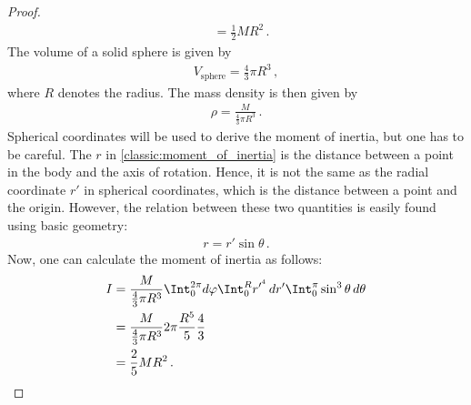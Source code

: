 \begin{example}
\begin{mdframed}[roundcorner=10pt, linecolor=blue, linewidth=1pt]
\begin{proof}
\begin{align*}
                    &= \frac{1}{2}MR^2\,.
                \end{align*}
                The volume of a solid sphere is given by
                \begin{gather*}
                    V_{\text{sphere}} = \frac{4}{3}\pi R^3\,,
                \end{gather*}
                where $R$ denotes the radius. The mass density is then given by
                \begin{gather*}
                    \rho = \frac{M}{\frac{4}{3}\pi R^3}\,.
                \end{gather*}
                Spherical coordinates will be used to derive the moment of inertia, but one has to be careful. The $r$ in \cref{classic:moment_of_inertia} is the distance between a point in the body and the axis of rotation. Hence, it is not the same as the radial coordinate $r'$ in spherical coordinates, which is the distance between a point and the origin. However, the relation between these two quantities is easily found using basic geometry:
                \begin{gather*}
                    r=r'\sin\theta\,.
                \end{gather*}
                Now, one can calculate the moment of inertia as follows:
                \begin{align*}
                    I &= \frac{M}{\frac{4}{3}\pi R^3}\Int_0^{2\pi}d\varphi\Int_0^Rr'^{^4}\,dr'\Int_0^\pi\sin^3\theta\,d\theta\\
                    &= \frac{M}{\frac{4}{3}\pi R^3} 2\pi\frac{R^5}{5}\frac{4}{3}\\
                    &= \frac{2}{5}MR^2\,.
                \end{align*}
            \end{proof}
        \end{mdframed}
    \end{example}


